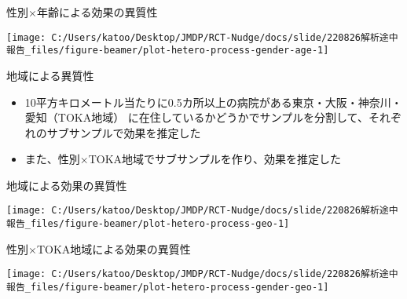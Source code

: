 \documentclass[
      aspectratio=169,
        12pt,
    ]{beamer}
\providecommand{\tightlist}{%
  \setlength{\itemsep}{0pt}\setlength{\parskip}{0pt}}
\begin{document}
\begin{frame}{性別×年齢による効果の異質性}
\protect\hypertarget{ux6027ux5225ux5e74ux9f62ux306bux3088ux308bux52b9ux679cux306eux7570ux8ceaux6027-2}{}
\begin{center}\texttt{[image: C:/Users/katoo/Desktop/JMDP/RCT-Nudge/docs/slide/220826解析途中報告\_files/figure-beamer/plot-hetero-process-gender-age-1]} \end{center}
\end{frame}

\begin{frame}{地域による異質性}
\protect\hypertarget{ux5730ux57dfux306bux3088ux308bux7570ux8ceaux6027-1}{}
\begin{itemize}
\tightlist
\item
  10平方キロメートル当たりに0.5カ所以上の病院がある東京・大阪・神奈川・愛知（TOKA地域）
  に在住しているかどうかでサンプルを分割して、それぞれのサブサンプルで効果を推定した
\item
  また、性別×TOKA地域でサブサンプルを作り、効果を推定した
\end{itemize}
\end{frame}

\begin{frame}{地域による効果の異質性}
\protect\hypertarget{ux5730ux57dfux306bux3088ux308bux52b9ux679cux306eux7570ux8ceaux6027}{}
\begin{center}\texttt{[image: C:/Users/katoo/Desktop/JMDP/RCT-Nudge/docs/slide/220826解析途中報告\_files/figure-beamer/plot-hetero-process-geo-1]} \end{center}
\end{frame}

\begin{frame}{性別×TOKA地域による効果の異質性}
\protect\hypertarget{ux6027ux5225tokaux5730ux57dfux306bux3088ux308bux52b9ux679cux306eux7570ux8ceaux6027}{}
\begin{center}\texttt{[image: C:/Users/katoo/Desktop/JMDP/RCT-Nudge/docs/slide/220826解析途中報告\_files/figure-beamer/plot-hetero-process-gender-geo-1]} \end{center}
\end{frame}
\end{document}
